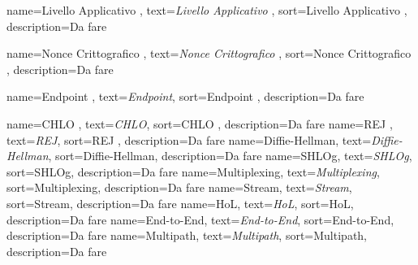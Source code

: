  {
    name=Livello Applicativo ,
    text=\emph{Livello Applicativo },
    sort=Livello Applicativo ,
    description={Da fare}
}

 {
    name=Nonce Crittografico ,
    text=\emph{Nonce Crittografico },
    sort=Nonce Crittografico ,
    description={Da fare}
}

 {
    name=Endpoint ,
    text=\emph{Endpoint},
    sort=Endpoint ,
    description={Da fare}
}

 {
    name=CHLO ,
    text=\emph{CHLO},
    sort=CHLO ,
    description={Da fare}
}
 {
    name=REJ ,
    text=\emph{REJ},
    sort=REJ ,
    description={Da fare}
}
 {
    name=Diffie-Hellman,
    text=\emph{Diffie-Hellman},
    sort=Diffie-Hellman,
    description={Da fare}
}
 {
    name=SHLOg,
    text=\emph{SHLOg},
    sort=SHLOg,
    description={Da fare}
}
 {
    name=Multiplexing,
    text=\emph{Multiplexing},
    sort=Multiplexing,
    description={Da fare}
}
 {
    name=Stream,
    text=\emph{Stream},
    sort=Stream,
    description={Da fare}
}
 {
    name=HoL,
    text=\emph{HoL},
    sort=HoL,
    description={Da fare}
}
 {
    name=End-to-End,
    text=\emph{End-to-End},
    sort=End-to-End,
    description={Da fare}
}
 {
    name=Multipath,
    text=\emph{Multipath},
    sort=Multipath,
    description={Da fare}
}